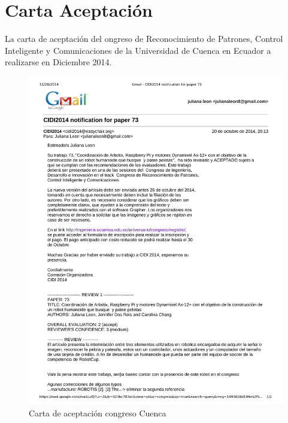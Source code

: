 \chapter{Carta Aceptaci\'on} \label{chapter:carta}
La carta de aceptaci\'on del ongreso de Reconocimiento de Patrones, Control Inteligente y Comunicaciones de la Universidad de Cuenca en Ecuador a realizarse en Diciembre 2014.
\begin{figure}[htp] 
\centering
\includegraphics[scale=1]{imagenes/carta.pdf} 
%
\caption{Carta de aceptaci\'on congreso Cuenca}
\end{figure}  
